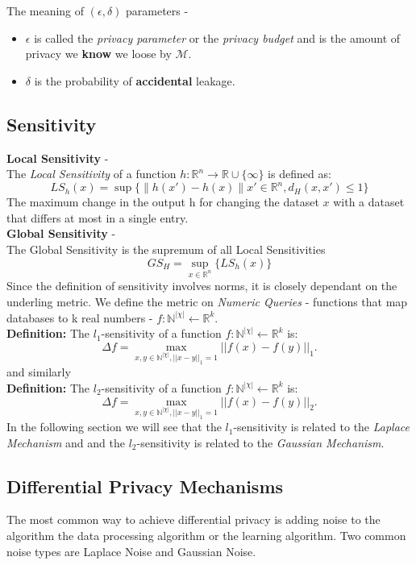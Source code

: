 \documentclass[fourier]{_style/dissertation}
\begin{document}
The meaning of $(\epsilon, \delta)$ parameters - \\
\begin{itemize}
    \item $\epsilon$ is called the \textit{privacy parameter} or the \textit{privacy budget} and is the amount of privacy we \textbf{know} we loose by $\mathcal{M}$. 
    \item $\delta$ is the probability of \textbf{accidental} leakage.
\end{itemize}


\subsection{Sensitivity}
\textbf{Local Sensitivity} - \\
The \textit{Local Sensitivity} of a function $h:\mathbb{R}^{n}\rightarrow\mathbb{R} \cup \{\infty\}$ is defined as: 
$$LS_{h}(x)=\sup\{\|h(x')-h(x)\|x'\in\mathbb{R}^{n},d_{H}(x,x')\leq 1 \}$$
The maximum change in the output h for changing the dataset $x$ with a dataset that differs at most in a single entry. \\
\textbf{Global Sensitivity} - \\
The Global Sensitivity is the supremum of all Local Sensitivities 
$$GS_{H}=\sup\limits_{x\in\mathbb{R}^{n}}\{LS_{h}(x)\}$$
Since the definition of sensitivity involves norms, it is closely dependant on the underling metric. We define the metric on \textit{Numeric Queries} - functions that map databases to k real numbers -  $f: \mathbb{N}^{|\chi|} \leftarrow \mathbb{R}^{k}$.\\
\textbf{Definition:} The $l_{1}$-sensitivity of a function $f: \mathbb{N}^{|\chi|} \leftarrow \mathbb{R}^{k}$ is: 
$$ \Delta f = \max_{x,y \in \mathbb{N}^{|\chi|}, ||x-y||_{1}=1} || f(x) - f(y) ||_{1}.$$
and similarly \\
\textbf{Definition:} The $l_{2}$-sensitivity of a function $f: \mathbb{N}^{|\chi|} \leftarrow \mathbb{R}^{k}$ is: 
$$ \Delta f = \max_{x,y \in \mathbb{N}^{|\chi|}, ||x-y||_{1}=1} || f(x) - f(y) ||_{2}.$$
In the following section we will see that the $l_{1}$-sensitivity is related to the \textit{Laplace Mechanism} and and the $l_{2}$-sensitivity is related to the \textit{Gaussian Mechanism}.
\subsection{Differential Privacy Mechanisms}
The most common way to achieve differential privacy is adding noise to the algorithm the data processing algorithm or the learning algorithm. Two common noise types are Laplace Noise and Gaussian Noise.
\end{document}
